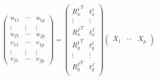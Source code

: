 \begin{equation}\label{eq:measurementMatrix}
\begin{pmatrix}
u_{11}& \cdots & u_{1p}\\
\vdots& \vdots &\vdots\\
u_{f1}& \cdots & u_{fp}\\
v_{11}& \cdots & v_{1p}\\
\vdots& \vdots &\vdots\\
v_{f1}& \cdots & v_{fp}
\end{pmatrix}
=
\begin{pmatrix}
{R_x^1}^T & t_x^1\\
\vdots & \vdots\\
{R_x^f}^T & t_x^f\\
{R_y^1}^T & t_y^1\\
\vdots & \vdots\\
{R_y^f}^T & t_y^f\\
\end{pmatrix}
\begin{pmatrix}
X_1&\cdots &X_p
\end{pmatrix}
\end{equation}


